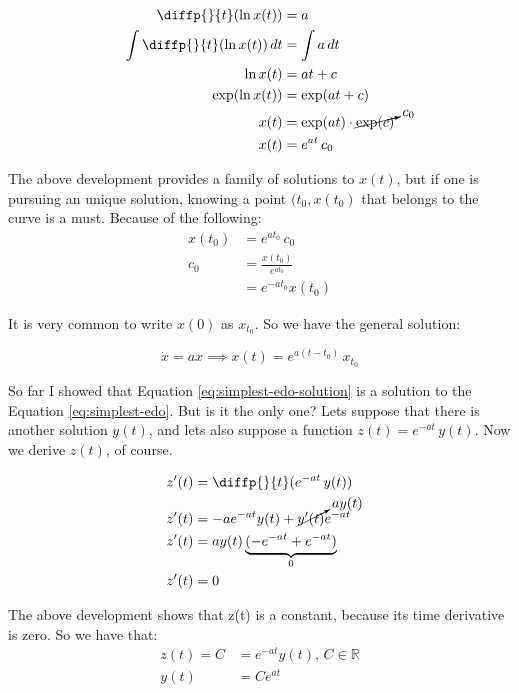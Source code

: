\documentclass[12pt]{article}
\begin{document}
\begin{align*}
    \diffp{}{t} (\ln{x(t)}) &= a \\
    \int{\diffp{}{t} (\ln{x(t)}) \, dt} &= \int{a \, dt} \\
    \ln{x(t)} &= at + c \\
    \exp(\ln{x(t)}) &= \exp(at + c) \\
    x(t) &= \exp(at) \cdot \cancelto{c_0}{\exp(c)} \\
    x(t) &= e^{at} \, c_0
\end{align*}

The above development provides a family of solutions to $x(t)$, but if one is pursuing an unique solution, knowing a point $(t_0, x(t_0)$ that belongs to the curve is a must. Because of the following:
\begin{align*}
    x(t_0) &= e^{at_0} \, c_0 \\
    c_0 &= \frac{x(t_0)}{e^{at_0}} \\
        &= e^{-at_0} x(t_0)
\end{align*}

It is very common to write $x(0)$ as $x_{t_0}$. So we have the general solution:

\begin{equation}
    \dot{x} = ax \implies x(t) = e^{a(t - t_0)} \, x_{t_0}
    \label{eq:simplest-edo-solution}
\end{equation}

So far I showed that Equation \ref{eq:simplest-edo-solution} is a solution to the  Equation \ref{eq:simplest-edo}. But is it the only one? Lets suppose that there is another solution $y(t)$, and lets also suppose a function $z(t) = e^{-at} \, y(t)$. Now we derive $z(t)$, of course.

\begin{align*}
    z'(t) &= \diffp{}{t}( e^{-at} \, y(t) ) \\
    z'(t) &= -a e^{-at} y(t) + \cancelto{a y(t)}{y'(t)} e^{-at} \\
    z'(t) &= a y(t) \underbrace{(-e^{-at} + e^{-at})}_\text{$0$}\\
    z'(t) &= 0
\end{align*}

The above development shows that z(t) is a constant, because its time derivative is zero. So we have that:
\begin{align*}
    z(t) = C &= e^{-at} y(t), \, C \in \mathbb{R}\\
    y(t) &= C e^{at}
\end{align*}
\end{document}
